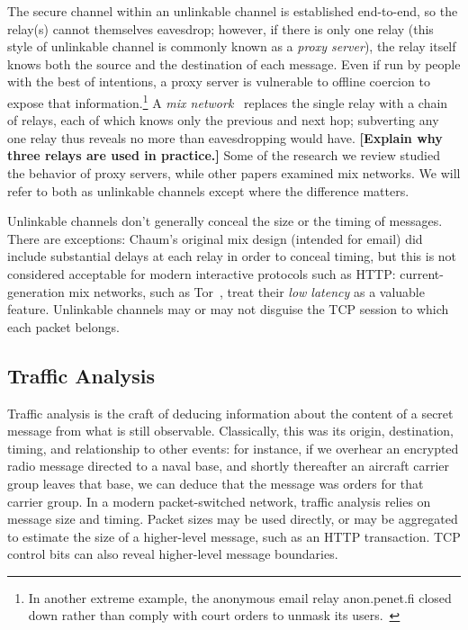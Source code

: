 \documentclass{zarticle}
\def\todo#1{{\color{todocolor}\bfseries [#1]}}
\begin{document}
The secure channel within an unlinkable channel is established
end-to-end, so the relay(s) cannot themselves eavesdrop; however, if
there is only one relay (this style of unlinkable channel is commonly
known as a \emph{proxy server}), the relay itself knows both the
source and the destination of each message.  Even if run by people
with the best of intentions, a proxy server is vulnerable to offline
coercion to expose that information.\footnote{In another extreme
  example, the anonymous email relay \textsf{anon.penet.fi} closed
  down rather than comply with court orders to unmask its
  users.~\cite{newman1996church}} A \emph{mix
  network}~\cite{chaum1981mix} replaces the single relay with a chain
of relays, each of which knows only the previous and next hop;
subverting any one relay thus reveals no more than eavesdropping would
have. \todo{Explain why three relays are used in practice.}  Some of
the research we review studied the behavior of proxy servers, while
other papers examined mix networks.  We will refer to both as
unlinkable channels except where the difference matters.

Unlinkable channels don't generally conceal the size or the timing of
messages.  There are exceptions: Chaum's original mix design (intended
for email) did include substantial delays at each relay in order to
conceal timing, but this is not considered acceptable for modern
interactive protocols such as HTTP: current-generation mix networks,
such as Tor~\cite{dingledine2004tor}, treat their \emph{low latency}
as a valuable feature.  Unlinkable channels may or may not disguise
the TCP session to which each packet belongs.

\subsection{Traffic Analysis}

Traffic analysis is the craft of deducing information about the
content of a secret message from what is still observable.
Classically, this was its origin, destination, timing, and
relationship to other events: for instance, if we overhear an
encrypted radio message directed to a naval base, and shortly
thereafter an aircraft carrier group leaves that base, we can deduce
that the message was orders for that carrier group.  In a modern
packet-switched network, traffic analysis relies on message size and
timing.  Packet sizes may be used directly, or may be aggregated to
estimate the size of a higher-level message, such as an HTTP
transaction.  TCP control bits can also reveal higher-level message
boundaries.
\end{document}
